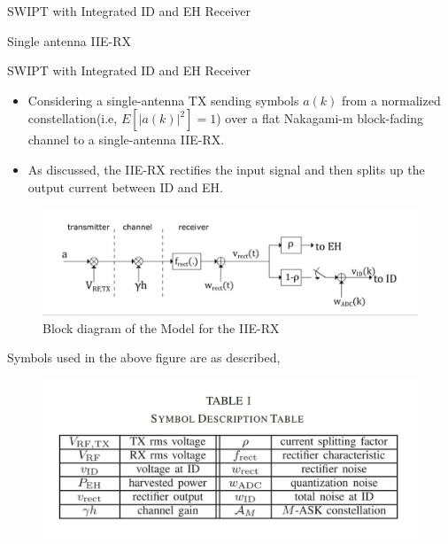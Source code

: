 \documentclass{beamer}
\begin{document}
\begin{section}{SWIPT with Integrated ID and EH Receiver}
\begin{subsection}{Single antenna IIE-RX}
\begin{frame}{SWIPT with Integrated ID and EH Receiver}
  \begin{itemize}
    \item Considering a single-antenna TX sending symbols $a(k)$ from a normalized constellation(i.e, $E[|a(k)|^2]=1$) over a flat Nakagami-m block-fading channel to a single-antenna IIE-RX.
    \item As discussed, the IIE-RX rectifies the input signal and then splits up the output current between ID and EH.
    \end{itemize}

    \begin{figure}[t]
        \centering
         \includegraphics[scale=0.3]{Images/Picture1.jpeg}
        \caption{Block diagram of the Model for the IIE-RX}
        \label{fig:my_label}
        \end{figure}
\end{frame}
\begin{frame}
    Symbols used in the above figure are as described,
    \begin{figure}[t]
        \centering
         \includegraphics[scale=0.3]{Images/Picture2.jpeg}
        \label{fig:my_label2}
        \end{figure}
\end{frame}
\begin{frame}
    \begin{itemize}

\end{itemize}
\end{frame}
\end{subsection}
\end{section}
\end{document}
